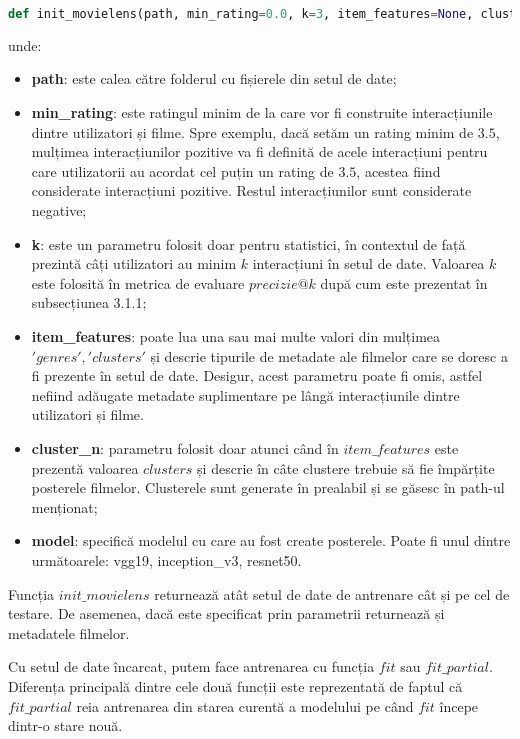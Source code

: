 \begin{lstlisting}[language=Python, caption=\textit{Funcția de inițializare a bazei de date}]
def init_movielens(path, min_rating=0.0, k=3, item_features=None, cluster_n=18, model='vgg19')
\end{lstlisting}
unde:
\begin{itemize}
	\item \textbf{path}: este calea către folderul cu fișierele din setul de date;
	\item \textbf{min\_rating}: este ratingul minim de la care vor fi construite interacțiunile dintre utilizatori și filme. Spre exemplu, dacă setăm un rating minim de $3.5$, mulțimea interacțiunilor pozitive va fi definită de acele interacțiuni pentru care utilizatorii au acordat cel puțin un rating de $3.5$, acestea fiind considerate interacțiuni pozitive. Restul interacțiunilor sunt considerate negative;
	\item \textbf{k}: este un parametru folosit doar pentru statistici, în contextul de față prezintă câți utilizatori au minim $k$ interacțiuni în setul de date. Valoarea $k$ este folosită în metrica de evaluare $precizie@k$ după cum este prezentat în subsecțiunea 3.1.1; 
	\item \textbf{item\_features}: poate lua una sau mai multe valori din mulțimea ${'genres', 'clusters'}$ și descrie tipurile de metadate ale filmelor care se doresc a fi prezente în setul de date. Desigur, acest parametru poate fi omis, astfel nefiind adăugate metadate suplimentare pe lângă interacțiunile dintre utilizatori și filme.
	\item \textbf{cluster\_n}: parametru folosit doar atunci când în $item\_features$ este prezentă valoarea $clusters$ și descrie în câte clustere trebuie să fie împărțite posterele filmelor. Clusterele sunt generate în prealabil și se găsesc în path-ul menționat;
	\item \textbf{model}: specifică modelul cu care au fost create posterele. Poate fi unul dintre următoarele: vgg19, inception\_v3, resnet50.
\end{itemize}
Funcția $init\_movielens$ returnează atât setul de date de antrenare cât și pe cel de testare. De asemenea, dacă este specificat prin parametrii returnează și metadatele filmelor.

Cu setul de date încarcat, putem face antrenarea cu funcția $fit$ sau $fit\_partial$. Diferența principală dintre cele două funcții este reprezentată de faptul că $fit\_partial$ reia antrenarea din starea curentă a modelului pe când $fit$ începe dintr-o stare nouă. 

